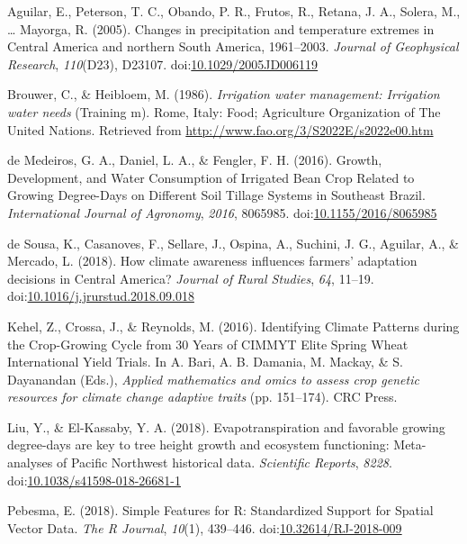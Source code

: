 \documentclass[
]{article}
\newlength{\cslhangindent}
\newenvironment{cslreferences}%
  {\setlength{\parindent}{0pt}%
  \everypar{\setlength{\hangindent}{\cslhangindent}}\ignorespaces}%
  {\par}
\begin{document}
\hypertarget{refs}{}
\begin{cslreferences}
\leavevmode\hypertarget{ref-Aguilar2005}{}%
Aguilar, E., Peterson, T. C., Obando, P. R., Frutos, R., Retana, J. A.,
Solera, M., \ldots{} Mayorga, R. (2005). Changes in precipitation and
temperature extremes in Central America and northern South America,
1961--2003. \emph{Journal of Geophysical Research}, \emph{110}(D23),
D23107.
doi:\href{https://doi.org/10.1029/2005JD006119}{10.1029/2005JD006119}

\leavevmode\hypertarget{ref-Brouwer1986}{}%
Brouwer, C., \& Heibloem, M. (1986). \emph{Irrigation water management:
Irrigation water needs} (Training m). Rome, Italy: Food; Agriculture
Organization of The United Nations. Retrieved from
\url{http://www.fao.org/3/S2022E/s2022e00.htm}

\leavevmode\hypertarget{ref-deMedeiros2016}{}%
de Medeiros, G. A., Daniel, L. A., \& Fengler, F. H. (2016). Growth,
Development, and Water Consumption of Irrigated Bean Crop Related to
Growing Degree-Days on Different Soil Tillage Systems in Southeast
Brazil. \emph{International Journal of Agronomy}, \emph{2016}, 8065985.
doi:\href{https://doi.org/10.1155/2016/8065985}{10.1155/2016/8065985}

\leavevmode\hypertarget{ref-deSousa2018}{}%
de Sousa, K., Casanoves, F., Sellare, J., Ospina, A., Suchini, J. G.,
Aguilar, A., \& Mercado, L. (2018). How climate awareness influences
farmers' adaptation decisions in Central America? \emph{Journal of Rural
Studies}, \emph{64}, 11--19.
doi:\href{https://doi.org/10.1016/j.jrurstud.2018.09.018}{10.1016/j.jrurstud.2018.09.018}

\leavevmode\hypertarget{ref-Kehel2016}{}%
Kehel, Z., Crossa, J., \& Reynolds, M. (2016). Identifying Climate
Patterns during the Crop-Growing Cycle from 30 Years of CIMMYT Elite
Spring Wheat International Yield Trials. In A. Bari, A. B. Damania, M.
Mackay, \& S. Dayanandan (Eds.), \emph{Applied mathematics and omics to
assess crop genetic resources for climate change adaptive traits} (pp.
151--174). CRC Press.

\leavevmode\hypertarget{ref-YLiu2018}{}%
Liu, Y., \& El-Kassaby, Y. A. (2018). Evapotranspiration and favorable
growing degree-days are key to tree height growth and ecosystem
functioning: Meta-analyses of Pacific Northwest historical data.
\emph{Scientific Reports}, \emph{8228}.
doi:\href{https://doi.org/10.1038/s41598-018-26681-1}{10.1038/s41598-018-26681-1}

\leavevmode\hypertarget{ref-sf}{}%
Pebesma, E. (2018). Simple Features for R: Standardized Support for
Spatial Vector Data. \emph{The R Journal}, \emph{10}(1), 439--446.
doi:\href{https://doi.org/10.32614/RJ-2018-009}{10.32614/RJ-2018-009}


\end{cslreferences}
\end{document}
